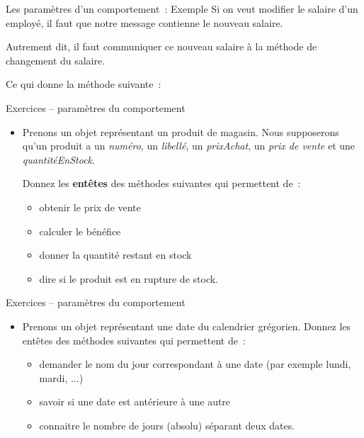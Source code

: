 \begin{frame}{Les paramètres d'un comportement~: Exemple}
		Si on veut modifier le salaire d'un employé, 
		il faut que notre message contienne le nouveau salaire. 
		
		Autrement dit, 
		il faut communiquer ce nouveau salaire à la méthode 
		de changement du salaire.
		
		\bigskip
		
		Ce qui donne la méthode suivante~:

\end{frame}

\begin{frame}{Exercices – paramètres du comportement}
	\begin{itemize}
	\item 
		Prenons un objet représentant un produit de magasin. 
		Nous supposerons qu'un produit a un \textit{numéro}, 
		un  \textit{libellé}, un \textit{prixAchat}, 
		un \textit{prix de vente} et une \textit{quantitéEnStock}.
		
		\bigskip
		
		Donnez les \textbf{entêtes} des méthodes suivantes 
		qui permettent de~:
		\begin{itemize}
		\item 
			obtenir le prix de vente
		\item 
			calculer le bénéfice
		\item 
			donner la quantité restant en stock
		\item 
			dire si le produit est en rupture de stock.
		\end{itemize}
	\end{itemize}
\end{frame}

\begin{frame}{Exercices – paramètres du comportement}
	\begin{itemize}
	\item 
		Prenons un objet représentant une date du calendrier grégorien. 
		Donnez les entêtes des méthodes suivantes qui permettent de~:
		\begin{itemize}
		\item
			demander le nom du jour correspondant à une date (par exemple lundi, mardi, ...)
		\item 
			savoir si une date est antérieure à une autre
		\item 
			connaitre le nombre de jours (absolu) séparant deux dates.
		\end{itemize}
	\end{itemize}
\end{frame}

